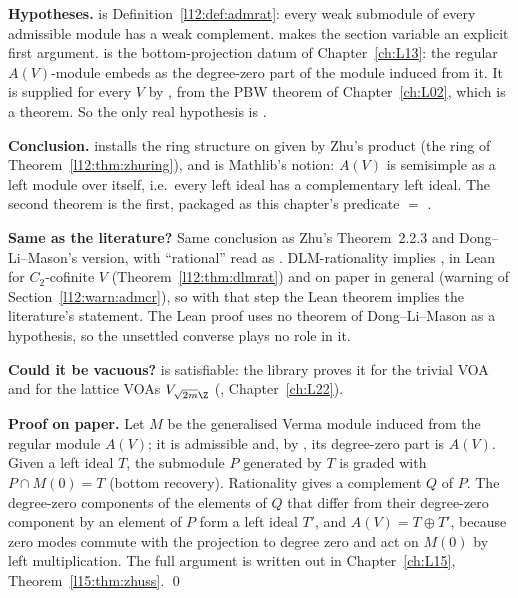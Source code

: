 \begin{dictionary}
\textbf{Hypotheses.}  is Definition~\ref{l12:def:admrat}: every weak submodule of every
admissible module has a weak complement.  makes the section variable  an explicit first
argument.  is the bottom-projection datum of Chapter~\ref{ch:L13}: the regular $A(V)$-module embeds as the degree-zero
part of the module induced from it. It is supplied for every $V$ by , from the PBW theorem
 of Chapter~\ref{ch:L02}, which is a theorem. So the only real hypothesis is .

\textbf{Conclusion.}  installs the ring structure on  given by Zhu's product (the ring of
Theorem~\ref{l12:thm:zhuring}), and  is Mathlib's notion: $A(V)$ is semisimple as a left module
over itself, i.e.\ every left ideal has a complementary left ideal. The second theorem is the first, packaged as this chapter's
predicate  $=$ .

\textbf{Same as the literature?} Same conclusion as Zhu's Theorem~2.2.3 and Dong--Li--Mason's version, with ``rational'' read
as . DLM-rationality implies , in Lean for $C_2$-cofinite $V$
(Theorem~\ref{l12:thm:dlmrat}) and on paper in general (warning of Section~\ref{l12:warn:admcr}), so with that step the
Lean theorem implies the literature's statement. The Lean proof uses no
theorem of Dong--Li--Mason as a hypothesis, so the unsettled converse plays no role in it.

\textbf{Could it be vacuous?}  is satisfiable: the library proves it for the trivial VOA and for the
lattice VOAs $V_{\sqrt{2m}\Z}$ (, Chapter~\ref{ch:L22}).
\end{dictionary}

\textbf{Proof on paper.} Let $M$ be the generalised Verma module induced from the regular module $A(V)$; it is admissible and,
by , its degree-zero part is $A(V)$. Given a left ideal $T$, the submodule $P$ generated by $T$ is graded with
$P\cap M(0)=T$ (bottom recovery). Rationality gives a complement $Q$ of $P$. The degree-zero components of the elements of $Q$
that differ from their degree-zero component by an element of $P$ form a left ideal $T'$, and $A(V)=T\oplus T'$, because zero
modes commute with the projection to degree zero and act on $M(0)$ by left multiplication. The full argument is written out in
Chapter~\ref{ch:L15}, Theorem~\ref{l15:thm:zhuss}. \qed

